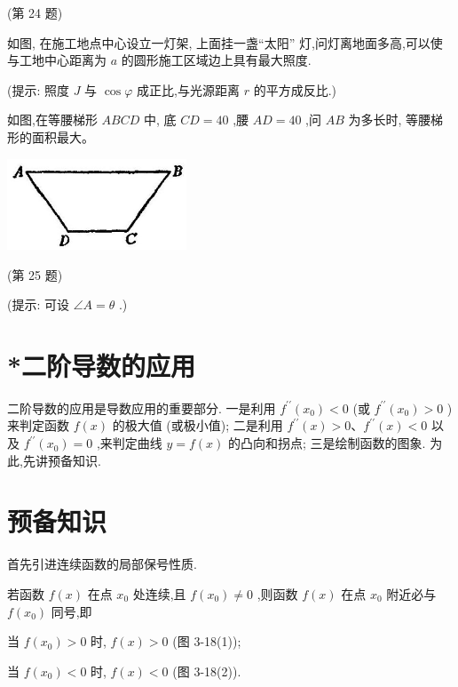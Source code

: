 \documentclass[lang=cn,newtx,10pt,scheme=chinese]{elegantbook}
\begin{document}
\begin{problemset}[习 题 十 一]
(第 24 题)

\item 如图, 在施工地点中心设立一灯架, 上面挂一盏“太阳” 灯,问灯离地面多高,可以使与工地中心距离为 \(a\) 的圆形施工区域边上具有最大照度.

(提示: 照度 \(J\) 与 \(\cos \varphi\) 成正比,与光源距离 \(r\) 的平方成反比.)

\item 如图,在等腰梯形 \({ABCD}\) 中, 底 \({CD} = {40}\) ,腰 \({AD} = {40}\) ,问 \({AB}\) 为多长时, 等腰梯形的面积最大。

\begin{center}
\includegraphics[max width=0.4\textwidth]{images/01912c18-5c3f-733d-b775-749ba9897a9d_159_135403.jpg}
\end{center}

(第 25 题)

(提示: 可设 \(\angle A = \theta\) .)

\end{problemset}

\section*{*二阶导数的应用}

二阶导数的应用是导数应用的重要部分. 一是利用 \({f}^{\prime \prime }\left( {x}_{0}\right) < 0\) (或 \({f}^{\prime \prime }\left( {x}_{0}\right) > 0\) ) 来判定函数 \(f\left( x\right)\) 的极大值 (或极小值); 二是利用 \({f}^{\prime \prime }\left( x\right) > 0\text{、}{f}^{\prime \prime }\left( x\right) < 0\) 以及 \({f}^{\prime \prime }\left( {x}_{0}\right) = 0\) ,来判定曲线 \(y = f\left( x\right)\) 的凸向和拐点; 三是绘制函数的图象. 为此,先讲预备知识.

\section{预备知识}

首先引进连续函数的局部保号性质.

\begin{theorem}[局部保号性质]

若函数 \(f\left( x\right)\) 在点 \({x}_{0}\) 处连续,且 \(f\left( {x}_{0}\right) \neq 0\) ,则函数 \(f\left( x\right)\) 在点 \({x}_{0}\) 附近必与 \(f\left( {x}_{0}\right)\) 同号,即

当 \(f\left( {x}_{0}\right) > 0\) 时, \(f\left( x\right) > 0\) (图 3-18(1));

当 \(f\left( {x}_{0}\right) < 0\) 时, \(f\left( x\right) < 0\) (图 3-18(2)).

\end{theorem}
\end{document}
